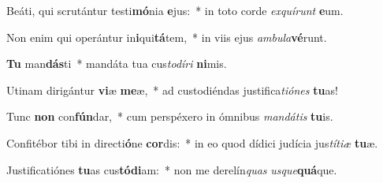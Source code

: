 \item Beáti, qui scrutántur testi\textbf{mó}nia \textbf{e}jus:~* in toto corde \textit{ex}\textit{quí}\textit{runt} \textbf{e}um.
\item Non enim qui operántur in\textbf{i}qui\textbf{tá}tem,~* in viis ejus \textit{am}\textit{bu}\textit{la}\textbf{vé}runt.
\item \textbf{Tu} man\textbf{dás}ti~* mandáta tua cus\textit{to}\textit{dí}\textit{ri} \textbf{ni}mis.
\item Utinam dirigántur \textbf{vi}æ \textbf{me}æ,~* ad custodiéndas justifica\textit{ti}\textit{ó}\textit{nes} \textbf{tu}as!
\item Tunc \textbf{non} con\textbf{fún}dar,~* cum perspéxero in ómnibus \textit{man}\textit{dá}\textit{tis} \textbf{tu}is.
\item Confitébor tibi in directi\textbf{ó}ne \textbf{cor}dis:~* in eo quod dídici judícia jus\textit{tí}\textit{ti}\textit{æ} \textbf{tu}æ.
\item Justificatiónes \textbf{tu}as cus\textbf{tó}\textbf{di}am:~* non me derelín\textit{quas} \textit{us}\textit{que}\textbf{quá}que.
